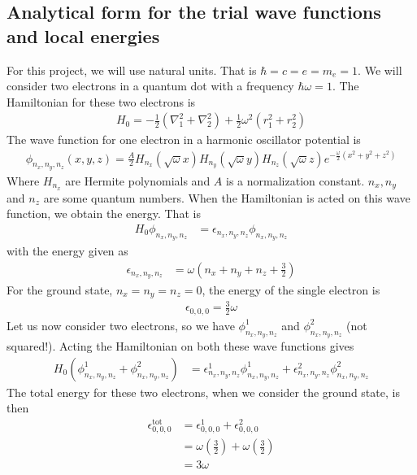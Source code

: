 \documentclass[12pt]{article}
\begin{document}
\subsection{Analytical form for the trial wave functions and local energies}
For this project, we will use natural units. That is $\hbar = c = e = m_e = 1$.
We will consider two electrons in a quantum dot with a frequency $\hbar \omega = 1$. The Hamiltonian for these two electrons is
\begin{align*}
H_0 = -\frac{1}{2}(\nabla_1^2 + \nabla_2^2) + \frac{1}{2}\omega^2(r_1^2 + r_2^2)
\end{align*}
The wave function for one electron in a harmonic oscillator potential is
\begin{align*}
\phi_{n_x, n_y, n_z}(x,y,z) = \frac{A}{2}H_{n_x}(\sqrt{\omega} x)H_{n_y}(\sqrt{\omega}y)H_{n_z}(\sqrt{\omega}z)e^{-\frac{\omega}{2}(x^2+y^2+z^2)}
\end{align*}
Where $H_{n_x}$ are Hermite polynomials and $A$ is a normalization constant. $n_x, n_y$ and $n_z$ are some quantum numbers. When the Hamiltonian is acted on this wave function, we obtain the energy. That is
\begin{align*}
H_0\phi_{n_x, n_y, n_z} &= \epsilon_{n_x, n_y, n_z}\phi_{n_x, n_y, n_z}
\end{align*}
with the energy given as
\begin{align*}
\epsilon_{n_x, n_y, n_z} &= \omega\left(n_x + n_y + n_z + \frac{3}{2} \right)
\end{align*}
For the ground state, $n_x = n_y = n_z = 0$, the energy of the single electron is
\begin{align*}
\epsilon_{0,0,0} = \frac{3}{2}\omega
\end{align*}
Let us now consider two electrons, so we have $\phi_{n_x, n_y, n_z}^1$ and $\phi_{n_x, n_y, n_z}^2$ (not squared!). Acting the Hamiltonian on both these wave functions gives
\begin{align*}
H_0(\phi_{n_x, n_y, n_z}^1 + \phi_{n_x, n_y, n_z}^2) &= \epsilon_{n_x, n_y, n_z}^1\phi_{n_x, n_y, n_z}^1 + \epsilon_{n_x, n_y, n_z}^2\phi_{n_x, n_y, n_z}^2 
\end{align*}
The total energy for these two electrons, when we consider the ground state, is then
\begin{align*}
\epsilon_{0,0,0}^{\text{tot}} &= \epsilon_{0,0,0}^1 + \epsilon_{0,0,0}^2 \\
&= \omega\left(\frac{3}{2} \right) + \omega\left(\frac{3}{2} \right)\\
&= 3\omega
\end{align*}
\end{document}
